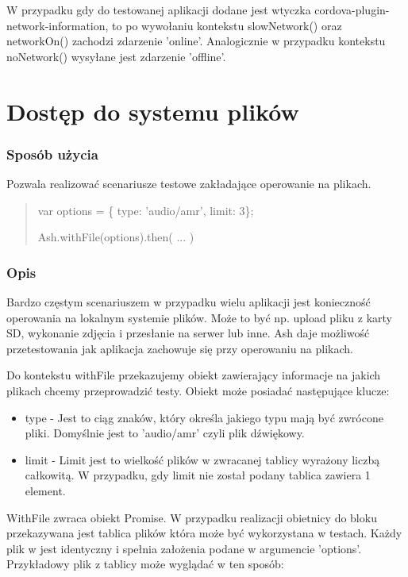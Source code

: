 \documentclass[brudnopis]{xmgr}
\begin{document}
W przypadku gdy do testowanej aplikacji dodane jest wtyczka cordova-plugin-network-information,  to po wywołaniu kontekstu slowNetwork() oraz networkOn() zachodzi zdarzenie 'online'. Analogicznie w przypadku kontekstu noNetwork() wysyłane jest zdarzenie 'offline'. 

\section{Dostęp do systemu plików}

\subsubsection{Sposób użycia}
Pozwala realizować scenariusze testowe zakładające operowanie na plikach.

\begin{quote}
var options = \{ type: 'audio/amr', limit: 3\};

Ash.withFile(options).then( ... )
\end{quote}

\subsubsection{Opis}

Bardzo częstym scenariuszem w przypadku wielu aplikacji jest konieczność operowania na lokalnym systemie plików. Może to być np. upload pliku z karty SD, wykonanie zdjęcia i przesłanie na serwer lub inne. Ash daje możliwość przetestowania jak aplikacja zachowuje się przy operowaniu na plikach.  

Do kontekstu withFile przekazujemy obiekt zawierający informacje na jakich plikach chcemy przeprowadzić testy. Obiekt może posiadać następujące klucze:

\begin{itemize}
  \item type - Jest to ciąg znaków, który określa jakiego typu mają być zwrócone pliki. Domyślnie jest to 'audio/amr' czyli plik dźwiękowy. 
  \item limit - Limit jest to wielkość plików w zwracanej tablicy wyrażony liczbą całkowitą. W przypadku, gdy limit nie został podany tablica zawiera 1 element. 
\end{itemize}

WithFile zwraca obiekt Promise. W przypadku realizacji obietnicy do bloku przekazywana jest tablica plików która może być wykorzystana w testach. Każdy plik w jest identyczny i spełnia założenia podane w argumencie 'options'. Przykładowy plik z tablicy może wyglądać w ten sposób:
\end{document}
